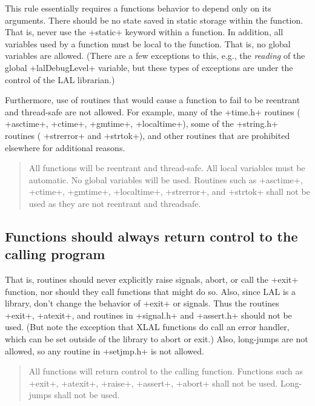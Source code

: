 \documentclass[10pt]{ligodcc}
\makeatletter
\def\verb{\relax\ifmmode\hbox\else\leavevmode\null\fi
  \bgroup
    \color{blue}\small
    \verb@eol@error \let\do\@makeother \dospecials
    \verbatim@font\@noligs
    \@ifstar\@sverb\@verb}
\newlength{\fminilength}
\newenvironment{fminipage}[1][\linewidth]
  {\setlength{\fminilength}{#1-2\fboxsep-2\fboxrule}%
   \begin{lrbox}{\fminibox}\begin{minipage}{\fminilength}}
  {\end{minipage}\end{lrbox}\noindent\fbox{\usebox{\fminibox}}}
\newenvironment{lalrule}{\begin{quote}\color{red}\begin{fminipage}}
  {\end{fminipage}\end{quote}}
\makeatother
\begin{document}
This rule essentially requires a functions behavior to depend only on its
arguments.  There should be no state saved in static storage within the
function.  That is, never use the \verb+static+ keyword within a function.
In addition, all variables used by a function must be local to the function.
That is, no global variables are allowed.  (There are a few exceptions to this,
e.g., the \emph{reading} of the global \verb+lalDebugLevel+ variable, but these
types of exceptions are under the control of the LAL librarian.)

Furthermore, use of routines that would cause a function to fail to be
reentrant and thread-safe are not allowed.  For example, many of the
\verb+time.h+ routines (\verb+asctime+, \verb+ctime+, \verb+gmtime+,
\verb+localtime+), some of the \verb+string.h+ routines (\verb+strerror+ and
\verb+strtok+), and other routines that are prohibited elsewhere for
additional reasons.
\begin{lalrule}
All functions will be reentrant and thread-safe.  All local variables
must be automatic.  No global variables will be used.  Routines such as
\verb+asctime+, \verb+ctime+, \verb+gmtime+, \verb+localtime+,
\verb+strerror+, and \verb+strtok+ shall not be used as they are not
reentrant and threadsafe.
\end{lalrule}


\subsection{Functions should always return control to the calling program}

That is, routines should never explicitly raise signals, abort, or call the
\verb+exit+ function, nor should they call functions that might do so.  Also,
since LAL is a library, don't change the behavior of \verb+exit+ or signals.
Thus the routines \verb+exit+, \verb+atexit+, and routines in \verb+signal.h+
and \verb+assert.h+ should not be used.  (But note the exception that XLAL
functions do call an error handler, which can be set outside of the library to
abort or exit.)  Also, long-jumps are not allowed, so any routine in
\verb+setjmp.h+ is not allowed.
\begin{lalrule}
All functions will return control to the calling function.  Functions such
as \verb+exit+, \verb+atexit+, \verb+raise+, \verb+assert+, \verb+abort+
shall not be used.  Long-jumps shall not be used.
\end{lalrule}
\end{document}

